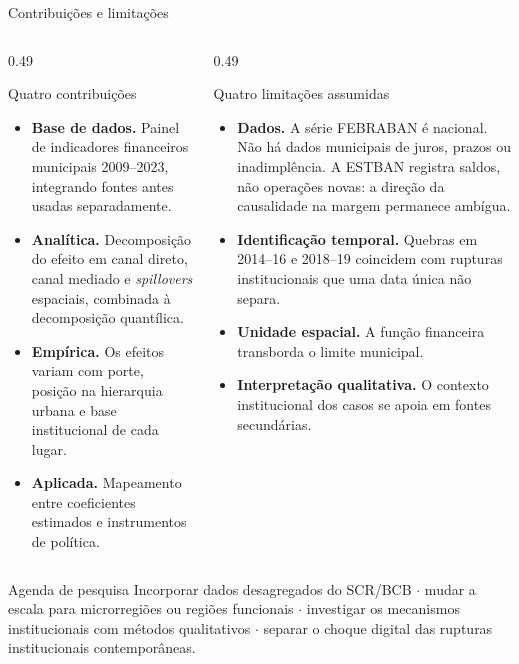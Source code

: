 \documentclass[aspectratio=169,10pt]{beamer}
\newcommand{\az}[1]{\textcolor{cedazul}{\textbf{#1}}}
\begin{document}
\begin{frame}{Contribuições e limitações}
  \begin{columns}[T]
    \begin{column}{0.49\textwidth}
      \begin{block}{Quatro contribuições}
        \footnotesize
        \begin{itemize}\setlength{\itemsep}{0.35em}
          \item \az{Base de dados.} Painel de indicadores financeiros municipais
            2009--2023, integrando fontes antes usadas separadamente.
          \item \az{Analítica.} Decomposição do efeito em canal direto, canal
            mediado e \emph{spillovers} espaciais, combinada à decomposição
            quantílica.
          \item \az{Empírica.} Os efeitos variam com porte, posição na hierarquia
            urbana e base institucional de cada lugar.
          \item \az{Aplicada.} Mapeamento entre coeficientes estimados e
            instrumentos de política.
        \end{itemize}
      \end{block}
    \end{column}
    \begin{column}{0.49\textwidth}
      \begin{alertblock}{Quatro limitações assumidas}
        \footnotesize
        \begin{itemize}\setlength{\itemsep}{0.35em}
          \item \az{Dados.} A série FEBRABAN é nacional. Não há dados municipais de
            juros, prazos ou inadimplência. A ESTBAN registra saldos, não operações
            novas: a direção da causalidade na margem permanece ambígua.
          \item \az{Identificação temporal.} Quebras em 2014--16 e 2018--19
            coincidem com rupturas institucionais que uma data única não separa.
          \item \az{Unidade espacial.} A função financeira transborda o limite
            municipal.
          \item \az{Interpretação qualitativa.} O contexto institucional dos casos
            se apoia em fontes secundárias.
        \end{itemize}
      \end{alertblock}
    \end{column}
  \end{columns}

  \vspace{0.1em}
  \begin{exampleblock}{Agenda de pesquisa}
    \scriptsize Incorporar dados desagregados do SCR/BCB $\cdot$ mudar a escala
    para microrregiões ou regiões funcionais $\cdot$ investigar os mecanismos
    institucionais com métodos qualitativos $\cdot$ separar o choque digital das
    rupturas institucionais contemporâneas.
  \end{exampleblock}
\end{frame}
\end{document}
